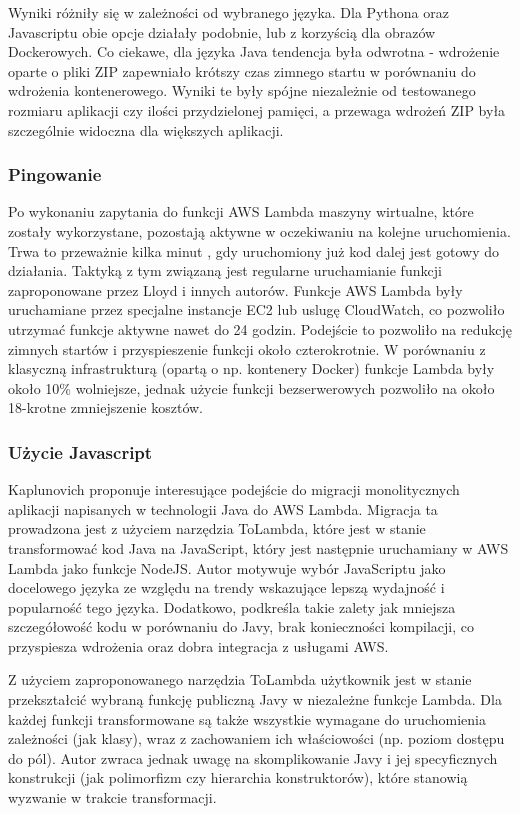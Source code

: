 Wyniki różniły się w zależności od wybranego języka. Dla Pythona oraz Javascriptu obie opcje działały podobnie, lub z korzyścią dla obrazów Dockerowych. 
Co ciekawe, dla języka Java tendencja była odwrotna - wdrożenie oparte o pliki ZIP zapewniało krótszy czas zimnego startu w porównaniu do wdrożenia kontenerowego. 
Wyniki te były spójne niezależnie od testowanego rozmiaru aplikacji czy ilości przydzielonej pamięci, a przewaga wdrożeń ZIP była szczególnie widoczna dla większych aplikacji.

\subsubsection*{Pingowanie}

Po wykonaniu zapytania do funkcji AWS Lambda maszyny wirtualne, które zostały wykorzystane, pozostają aktywne w oczekiwaniu na kolejne uruchomienia. 
Trwa to przeważnie kilka minut \cite{9284261}, gdy uruchomiony już kod dalej jest gotowy do działania.
Taktyką z tym związaną jest regularne uruchamianie funkcji zaproponowane przez \cite{8605779} Lloyd i innych autorów. 
Funkcje AWS Lambda były uruchamiane przez specjalne instancje EC2 lub uslugę CloudWatch, co pozwoliło utrzymać funkcje aktywne nawet do 24 godzin.
Podejście to pozwoliło na redukcję zimnych startów i przyspieszenie funkcji około czterokrotnie.
W porównaniu z klasyczną infrastrukturą (opartą o np. kontenery Docker) funkcje Lambda były około 10\% wolniejsze, jednak użycie funkcji bezserwerowych pozwoliło na około 18-krotne zmniejszenie kosztów. 

\subsubsection*{Użycie Javascript}
Kaplunovich \cite{8844428} proponuje interesujące podejście do migracji monolitycznych aplikacji napisanych w technologii Java do AWS Lambda.
Migracja ta prowadzona jest z użyciem narzędzia ToLambda, które jest w stanie transformować kod Java na JavaScript, który jest następnie uruchamiany w AWS Lambda jako funkcje NodeJS.
Autor motywuje wybór JavaScriptu jako docelowego języka ze względu na trendy wskazujące lepszą wydajność i popularność tego języka.
Dodatkowo, podkreśla takie zalety jak mniejsza szczegółowość kodu w porównaniu do Javy, brak konieczności kompilacji, co przyspiesza wdrożenia oraz dobra integracja z usługami AWS.

Z użyciem zaproponowanego narzędzia ToLambda użytkownik jest w stanie przekształcić wybraną funkcję publiczną Javy w niezależne funkcje Lambda.
Dla każdej funkcji transformowane są także wszystkie wymagane do uruchomienia zależności (jak klasy), wraz z zachowaniem ich właściowości (np. poziom dostępu do pól).
Autor zwraca jednak uwagę na skomplikowanie Javy i jej specyficznych konstrukcji (jak polimorfizm czy hierarchia konstruktorów), które stanowią wyzwanie w trakcie transformacji. 

